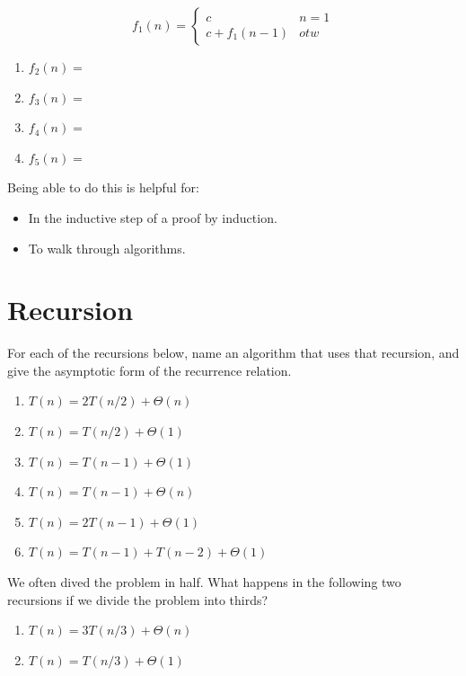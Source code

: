 \documentclass{article}
\begin{document}
$$ f_1(n) = \begin{cases}
                c & n=1 \\
                c + f_1(n-1) & otw
            \end{cases}
$$

\begin{enumerate}
    \item $f_2(n) = $
        \vspace{1in}
    \item $f_3(n) = $
        \vspace{1in}
    \item $f_4(n) = $
        \vspace{1in}
    \item $f_5(n) = $
        \vspace{1in}
\end{enumerate}

Being able to do this is helpful for:
\begin{itemize}
    \item In the inductive step of a proof by induction.
    \item To walk through algorithms.
\end{itemize}


\section*{Recursion}

For each of the recursions below, name an algorithm that uses that recursion, and
give the asymptotic form of the recurrence relation.

\begin{enumerate}
    \item $T(n) = 2 T(n/2) + \Theta(n)$\\
        \answer
    \item $T(n) = T(n/2) + \Theta(1)$\\
        \answer
    \item $T(n) = T(n-1) + \Theta(1)$\\
        \answer
    \item $T(n) = T(n-1) + \Theta(n)$\\
        \answer
    \item $T(n) = 2T(n-1) + \Theta(1)$\\
        \answer
    \item $T(n) = T(n-1) + T(n-2) + \Theta(1)$\\
        \answer
\end{enumerate}

We often dived the problem in half.  What happens in the following two
recursions if we divide the problem into thirds?
\begin{enumerate}
    \item $T(n) = 3 T(n/3) + \Theta(n)$\\
        \answer
    \item $T(n) = T(n/3) + \Theta(1)$\\
        \answer
\end{enumerate}
\end{document}
